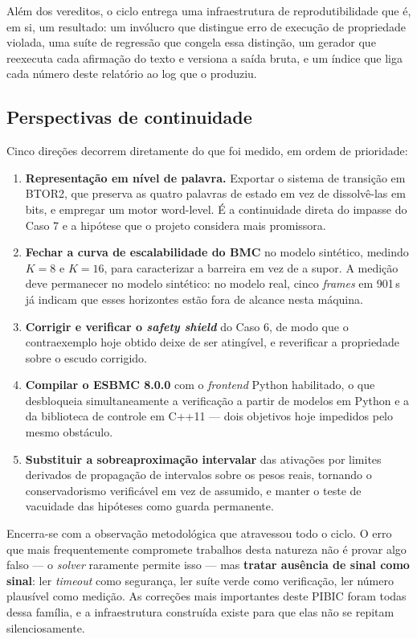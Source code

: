 Além dos vereditos, o ciclo entrega uma infraestrutura de reprodutibilidade que é, em si, um
resultado: um invólucro que distingue erro de execução de propriedade violada, uma suíte de
regressão que congela essa distinção, um gerador que reexecuta cada afirmação do texto e
versiona a saída bruta, e um índice que liga cada número deste relatório ao log que o produziu.

\subsection{Perspectivas de continuidade}

Cinco direções decorrem diretamente do que foi medido, em ordem de prioridade:

\begin{enumerate}[leftmargin=1.4cm]
  \item \textbf{Representação em nível de palavra.} Exportar o sistema de transição em BTOR2,
  que preserva as quatro palavras de estado em vez de dissolvê-las em bits, e empregar um motor
  word-level. É a continuidade direta do impasse do Caso 7 e a hipótese que o projeto considera
  mais promissora.
  \item \textbf{Fechar a curva de escalabilidade do BMC} no modelo sintético, medindo $K{=}8$ e
  $K{=}16$, para caracterizar a barreira em vez de a supor. A medição deve permanecer no modelo
  sintético: no modelo real, cinco \textit{frames} em 901\,s já indicam que esses horizontes
  estão fora de alcance nesta máquina.
  \item \textbf{Corrigir e verificar o \textit{safety shield}} do Caso 6, de modo que o
  contraexemplo hoje obtido deixe de ser atingível, e reverificar a propriedade sobre o escudo
  corrigido.
  \item \textbf{Compilar o ESBMC 8.0.0} com o \textit{frontend} Python habilitado, o que
  desbloqueia simultaneamente a verificação a partir de modelos em Python e a da biblioteca de
  controle em C++11 --- dois objetivos hoje impedidos pelo mesmo obstáculo.
  \item \textbf{Substituir a sobreaproximação intervalar} das ativações por limites derivados
  de propagação de intervalos sobre os pesos reais, tornando o conservadorismo verificável em
  vez de assumido, e manter o teste de vacuidade das hipóteses como guarda permanente.
\end{enumerate}

Encerra-se com a observação metodológica que atravessou todo o ciclo. O erro que mais
frequentemente compromete trabalhos desta natureza não é provar algo falso --- o
\textit{solver} raramente permite isso --- mas \textbf{tratar ausência de sinal como sinal}:
ler \textit{timeout} como segurança, ler suíte verde como verificação, ler número plausível
como medição. As correções mais importantes deste PIBIC foram todas dessa família, e a
infraestrutura construída existe para que elas não se repitam silenciosamente.

